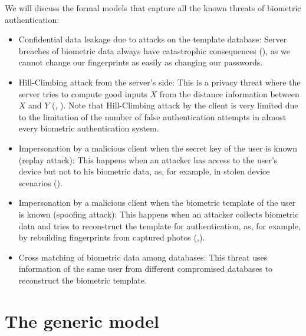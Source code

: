 We will discuss the formal models that capture all the known threats of
biometric authentication:
\begin{itemize}
\item Confidential data leakage due to attacks on the template database: Server
  breaches of biometric data always have catastrophic consequences
  (\cite{OPMsays563:online}), as we cannot change our fingerprints as easily as
  changing our passwords.
\item Hill-Climbing attack from the server's side: This is a privacy threat
  where the server tries to compute good inputs $X$ from the distance
  information between $X$ and $Y$ (\cite{uludag2004attacks},
  \cite{higo2015privacy}). Note that Hill-Climbing attack by the client is very
  limited due to the limitation of the number of false authentication attempts
  in almost every biometric authentication system.
\item Impersonation by a malicious client when the secret key of the user is
  known (replay attack): This happens when an attacker has access to the user's
  device but not to his biometric data, as, for example, in stolen device
  scenarios (\cite{zhang2015fingerprints}).
\item Impersonation by a malicious client when the biometric template of the
  user is known (spoofing attack): This happens when an attacker collects
  biometric data and tries to reconstruct the template for authentication, as,
  for example, by rebuilding fingerprints from captured photos
  (\cite{zhang2015fingerprints},\cite{feng2011fingerprint}).
\item Cross matching of biometric data among databases: This threat uses
  information of the same user from different compromised databases to
  reconstruct the biometric template.
\end{itemize}

\section{The generic model}

